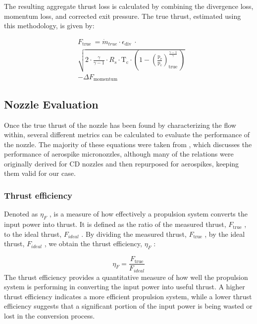 \documentclass{homework}
\begin{document}
\begin{multicols}{2}
		  The resulting aggregate thrust loss is calculated by combining the divergence loss, momentum loss, and corrected exit pressure. The true thrust, estimated using this methodology, is given by: 
    
\begin{align*}		    
&F_{\text {true }}=\dot{m}_{true} \cdot \epsilon_{\text {div }} \cdot \\
& \sqrt{2 \cdot \frac{\gamma}{\gamma-1} \cdot R_s \cdot \mathrm{T}_{\mathrm{c}} \cdot\left(1-\left(\frac{\mathrm{p}_{\mathrm{e}}}{\mathrm{p}_{\mathrm{c}}}\right)_{\text {true }}^{\frac{\gamma-1}{\gamma}}\right)}\\
&-\Delta F_{\text {momentum }}
\end{align*}

\subsection{Nozzle Evaluation}

Once the true thrust of the nozzle has been found by characterizing the flow within, several different metrics can be calculated to evaluate the performance of the nozzle. The majority of these equations were taken from \cite{de_almeida_fancaria_simplified_2020}, which discusses the performance of aerospike micronozzles, although many of the relations were originally derived for CD nozzles and then repurposed for aerospikes, keeping them valid for our case.

\subsubsection{Thrust efficiency}

Denoted as $\eta_F$ , is a measure of how effectively a propulsion system converts the input power into thrust. It is defined as the ratio of the measured thrust, $F_{\text{true}}$ , to the ideal thrust, $F_{ideal}$ . By dividing the measured thrust, $F_{\text{true}}$ , by the ideal thrust, $F_{ideal}$ , we obtain the thrust efficiency, $\eta_F$ :
		    
$$\eta_F = \frac{F_{\text{true}}}{F_{ideal}}$$ 		    
		  The thrust efficiency provides a quantitative measure of how well the propulsion system is performing in converting the input power into useful thrust. A higher thrust efficiency indicates a more efficient propulsion system, while a lower thrust efficiency suggests that a significant portion of the input power is being wasted or lost in the conversion process.  


\end{multicols}
\end{document}
